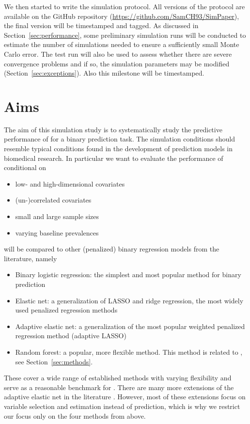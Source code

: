 \documentclass[a4paper, 11pt]{article}\usepackage[]{graphicx}\usepackage[]{color}
\begin{document}
We then started to write the simulation protocol. All versions of the protocol are
available on the GitHub repository (\url{https://github.com/SamCH93/SimPaper}),
the final version will be time\-stamped and tagged. As discussed in
Section~\ref{sec:performance}, some preliminary simulation runs will be conducted
to estimate the number of simulations needed to ensure a sufficiently small Monte
Carlo error. The test run will also be used to assess whether there are severe
convergence problems and if so, the simulation parameters may be modified 
(Section~\ref{sec:exceptions}). Also this milestone will be time\-stamped.

\section{Aims} \label{sec:aims}

The aim of this simulation study is to systematically study the predictive
performance of \ainet{} for a binary prediction task. The simulation conditions
should resemble typical conditions found in the development of prediction models
in biomedical research. In particular we want to evaluate the performance of
\ainet{} conditional on
\begin{itemize}
  \item low- and high-dimensional covariates
  \item (un-)correlated covariates
  \item small and large sample sizes
  \item varying baseline prevalences
\end{itemize}
\ainet{} will be compared to other (penalized) binary regression models
from the literature, namely
\begin{itemize}
  \item Binary logistic regression: the simplest and most popular method for
        binary prediction
  \item Elastic net: a generalization of LASSO and ridge regression, the most
        widely used penalized regression methods
  \item Adaptive elastic net: a generalization of the most popular weighted 
  penalized regression method (adaptive LASSO)
  \item Random forest: a popular, more flexible method. This method is related to
        \ainet{}, see Section~\ref{sec:methods}.
\end{itemize}
These cover a wide range of established methods with varying flexibility and
serve as a reasonable benchmark for \ainet. There are many more extensions of
the adaptive elastic net in the literature \citep[see \eg the review by][]{Vidaurre2013}.
However, most of these extensions focus on variable selection and
estimation instead of prediction, which is why we restrict our focus only on the
four methods from above.
\end{document}
